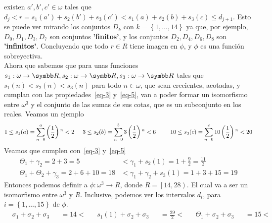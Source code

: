 \documentclass{article}
\begin{document}
\begin{itemize}
{            existen} \(a',b',c' \in \omega\) tales que \(d_j < r = s_1(a') + s_2(b') + s_3(c') < s_1(a) + s_2(b) + s_3(c) \leq d_{j+1}\).
            Esto se puede ver mirando los conjuntos \(D_k\) con \(k = \left\{1, \ldots, 14\right\}\) ya que, por ejemplo, \(D_0, D_1, D_3, D_7\) son conjuntos \textbf{'finitos'}, y 
            los conjuntos \(D_2, D_4, D_6, D_8\) son \textbf{'infinitos'}. Concluyendo que todo \(r \in R\) tiene imagen en \(\phi\), y \(\phi\) es una función sobreyectiva.
        \\[0.5cm]
        Ahora que sabemos que para unas funciones \(s_1: \omega \rightarrow \realR, s_2: \omega \rightarrow \realR, s_3: \omega \rightarrow \realR\) 
        tales que \(s_1(n) < s_2(n) < s_3(n)\) para todo \(n \in \omega\),
        que sean crecientes, acotadas, y cumplan con las propiedades~\eqref{eq-3} y~\eqref{eq-5}, 
        van a poder formar un isomorfismo entre \(\omega^3\) y el conjunto de las sumas de sus cotas, que es un subconjunto en los reales.
        Veamos un ejemplo
        \[
            \begin{aligned}
                1 \leq s_1(a) = \sum_{n=0}^{a} \left(\frac{1}{2}\right){}^{n} < 2 &
                \hspace{0.5cm}
                3 \leq s_2(b) = \sum_{n=0}^{b} 3\left(\frac{1}{2}\right){}^{n} < 6 &
                \hspace{0.5cm}
                10 \leq s_3(c) = \sum_{n=0}^{c} 10\left(\frac{1}{2}\right){}^{n} < 20
            \end{aligned}
        \]
        Veamos que cumplen con~\eqref{eq-3} y~\eqref{eq-5} 
        \[
            \begin{aligned}
                \Theta_1 + \gamma_2 = 2 + 3 = 5 &< \gamma_1 + s_2(1) = 1 + \frac{9}{2} = \frac{11}{2} \\
                \Theta_1 + \Theta_2 + \gamma_3 = 2 + 6 + 10 = 18 &< \gamma_1 + \gamma_2 + s_3(1) = 1 + 3 + 15 = 19
            \end{aligned}
        \]
        Entonces podemos definir a \(\phi: \omega^3 \rightarrow R\), donde \(R = \left[14, 28\right)\). El cual va a ser un isomorfismo entre \(\omega^3\) y \(R\).
        Inclusive, podemos ver los intervalos \(d_i\), para \(i = \left\{1, \ldots, 15\right\}\) de \(\phi\).
        \[
            \begin{aligned}
                &\sigma_1 + \sigma_2 + \sigma_3& &= 14 <& 
                &s_1(1) + \sigma_2 + \sigma_3& &= \frac{29}{2} <& 
                &\Theta_1 + \sigma_2 + \sigma_3& &= 15 < \\

\end{aligned}\]
\end{itemize}
\end{document}
